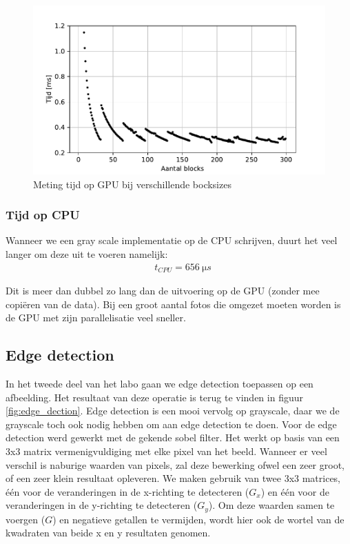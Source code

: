 \documentclass[11pt,twoside,a4paper]{article}
\begin{document}
\begin{figure}[h!]
    \centering
    \includegraphics[]{gpu_grayscale.pdf}
    \caption{Meting tijd op GPU bij verschillende bocksizes}
    \label{fig:meting_grayscale_gpu}
\end{figure}


\subsubsection{Tijd op CPU}

Wanneer we een gray scale implementatie op de CPU schrijven, duurt het veel langer om deze uit te voeren namelijk:
\begin{align*}
    &t_{CPU} = \SI{656}{\micro s}
\end{align*}

Dit is meer dan dubbel zo lang dan de uitvoering op de GPU (zonder mee copi\"eren van de data). Bij een groot aantal fotos die omgezet moeten worden is de GPU met zijn parallelisatie veel sneller.

\subsection{Edge detection}

In het tweede deel van het labo gaan we edge detection toepassen op een afbeelding. Het resultaat van deze operatie is terug te vinden in figuur \ref{fig:edge_dection}. Edge detection is een mooi vervolg op grayscale, daar we de grayscale toch ook nodig hebben om aan edge detection te doen. Voor de edge detection werd gewerkt met de gekende sobel filter. Het werkt op basis van een 3x3 matrix vermenigvuldiging met elke pixel van het beeld. Wanneer er veel verschil is naburige waarden van pixels, zal deze bewerking ofwel een zeer groot, of een zeer klein resultaat opleveren. We maken gebruik van twee 3x3 matrices, \'e\'en voor de veranderingen in de x-richting te detecteren ($G_x$) en \'e\'en voor de veranderingen in de y-richting te detecteren ($G_y$). Om deze waarden samen te voergen ($G$) en negatieve getallen te vermijden, wordt hier ook de wortel van de kwadraten van beide x en y resultaten genomen.
\end{document}
